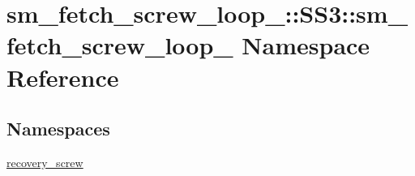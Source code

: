 \hypertarget{namespacesm__fetch__screw__loop__1_1_1SS3_1_1sm__fetch__screw__loop__1}{}\section{sm\+\_\+fetch\+\_\+screw\+\_\+loop\+\_\+:\+:S\+S3\+:\+:sm\+\_\+fetch\+\_\+screw\+\_\+loop\+\_ Namespace Reference}
\label{namespacesm__fetch__screw__loop__1_1_1SS3_1_1sm__fetch__screw__loop__1}
\subsection*{Namespaces}
\begin{DoxyCompactItemize}
\item 
 \hyperlink{namespacesm__fetch__screw__loop__1_1_1SS3_1_1sm__fetch__screw__loop__1_1_1recovery__screw}{recovery\+\_\+screw}
\end{DoxyCompactItemize}
